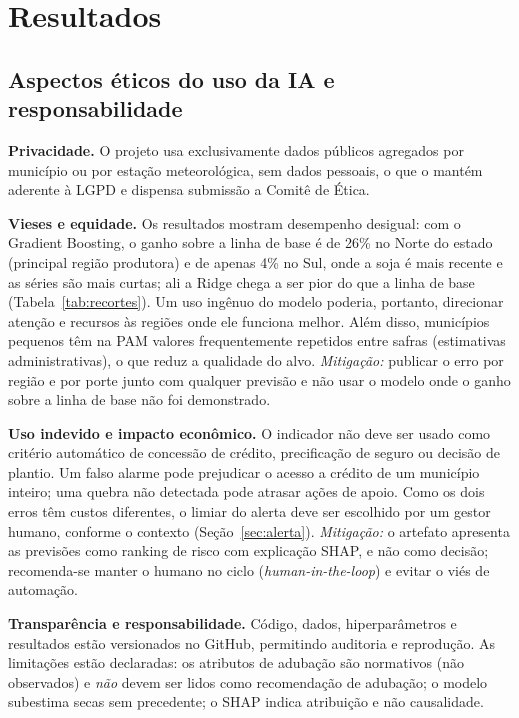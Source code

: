 \documentclass[12pt]{article}
\begin{document}
\section{Resultados}
\label{sec:resultados}

\subsection{Aspectos éticos do uso da IA e responsabilidade}

\textbf{Privacidade.} O projeto usa exclusivamente dados públicos agregados
por município ou por estação meteorológica, sem dados pessoais, o que o
mantém aderente à LGPD \cite{lgpd} e dispensa submissão a Comitê de Ética.

\textbf{Vieses e equidade.} Os resultados mostram desempenho desigual: com
o Gradient Boosting, o ganho sobre a linha de base é de 26\% no Norte do
estado (principal região produtora) e de apenas 4\% no Sul, onde a soja é mais recente e as séries
são mais curtas; ali a Ridge chega a ser pior do que a linha de base
(Tabela~\ref{tab:recortes}). Um uso ingênuo do modelo poderia, portanto,
direcionar atenção e recursos às regiões onde ele funciona melhor. Além
disso, municípios pequenos têm na PAM valores frequentemente repetidos
entre safras (estimativas administrativas), o que reduz a qualidade do
alvo. \emph{Mitigação:} publicar o erro por região e por porte junto com
qualquer previsão e não usar o modelo onde o ganho sobre a linha de base
não foi demonstrado.

\textbf{Uso indevido e impacto econômico.} O indicador não deve ser usado
como critério automático de concessão de crédito, precificação de seguro ou
decisão de plantio. Um falso alarme pode prejudicar o acesso a crédito de
um município inteiro; uma quebra não detectada pode atrasar ações de apoio.
Como os dois erros têm custos diferentes, o limiar do alerta deve ser
escolhido por um gestor humano, conforme o contexto
(Seção~\ref{sec:alerta}). \emph{Mitigação:} o artefato apresenta as
previsões como ranking de risco com explicação SHAP, e não como decisão;
recomenda-se manter o humano no ciclo (\emph{human-in-the-loop}) e evitar o
viés de automação.

\textbf{Transparência e responsabilidade.} Código, dados, hiperparâmetros
e resultados estão versionados no GitHub, permitindo auditoria e
reprodução. As limitações estão declaradas: os atributos de adubação são
normativos (não observados) e \emph{não} devem ser lidos como recomendação
de adubação; o modelo subestima secas sem precedente; o SHAP indica
atribuição e não causalidade.
\end{document}
